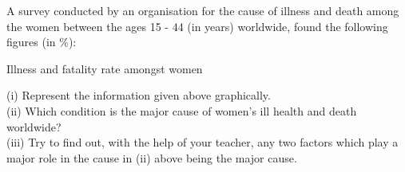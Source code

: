  A survey conducted by an organisation for the cause of illness and death among the women between the ages 15 - 44 (in years) worldwide, found the following figures (in $\%$):\\
\begin{table}[ht!]
\centering

\caption{Illness and fatality rate amongst women}
\label{table:input_37}
\end{table}
(i) Represent the information given above graphically.\\
(ii) Which condition is the major cause of women’s ill health and death worldwide?\\
(iii) Try to find out, with the help of your teacher, any two factors which play a major role in the cause in (ii) above being the major cause.\\
